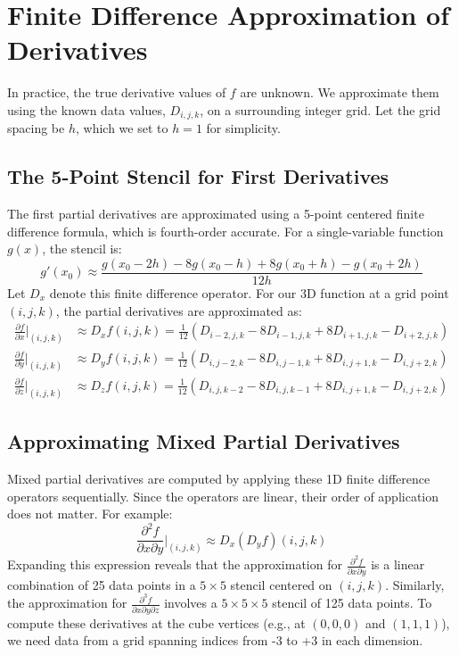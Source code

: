 \documentclass[12pt]{article}
\newcommand{\p}{\partial} %
\newcommand{\data}[3]{D_{#1,#2,#3}}
\begin{document}
\section{Finite Difference Approximation of Derivatives}

In practice, the true derivative values of $f$ are unknown. We approximate them using the known data values, $\data{i}{j}{k}$, on a surrounding integer grid. Let the grid spacing be $h$, which we set to $h=1$ for simplicity.

\subsection{The 5-Point Stencil for First Derivatives}

The first partial derivatives are approximated using a 5-point centered finite difference formula, which is fourth-order accurate. For a single-variable function $g(x)$, the stencil is:
\begin{equation}
    g'(x_0) \approx \frac{g(x_0-2h) - 8g(x_0-h) + 8g(x_0+h) - g(x_0+2h)}{12h}
\end{equation}
Let $D_x$ denote this finite difference operator. For our 3D function at a grid point $(i,j,k)$, the partial derivatives are approximated as:
\begin{align}
    \frac{\p f}{\p x}\bigg|_{(i,j,k)} &\approx D_x f(i,j,k) = \frac{1}{12} \left( \data{i-2}{j}{k} - 8\data{i-1}{j}{k} + 8\data{i+1}{j}{k} - \data{i+2}{j}{k} \right) \\
    \frac{\p f}{\p y}\bigg|_{(i,j,k)} &\approx D_y f(i,j,k) = \frac{1}{12} \left( \data{i}{j-2}{k} - 8\data{i}{j-1}{k} + 8\data{i}{j+1}{k} - \data{i}{j+2}{k} \right) \\
    \frac{\p f}{\p z}\bigg|_{(i,j,k)} &\approx D_z f(i,j,k) = \frac{1}{12} \left( \data{i}{j}{k-2} - 8\data{i}{j}{k-1} + 8\data{i}{j+1}{k} - \data{i}{j+2}{k} \right)
\end{align}

\subsection{Approximating Mixed Partial Derivatives}

Mixed partial derivatives are computed by applying these 1D finite difference operators sequentially. Since the operators are linear, their order of application does not matter. For example:
\begin{equation}
    \frac{\p^2 f}{\p x \p y}\bigg|_{(i,j,k)} \approx D_x \left( D_y f \right)(i,j,k)
\end{equation}
Expanding this expression reveals that the approximation for $\frac{\p^2 f}{\p x \p y}$ is a linear combination of 25 data points in a $5 \times 5$ stencil centered on $(i,j,k)$. Similarly, the approximation for $\frac{\p^3 f}{\p x \p y \p z}$ involves a $5 \times 5 \times 5$ stencil of 125 data points. To compute these derivatives at the cube vertices (e.g., at $(0,0,0)$ and $(1,1,1)$), we need data from a grid spanning indices from -3 to +3 in each dimension.
\end{document}

